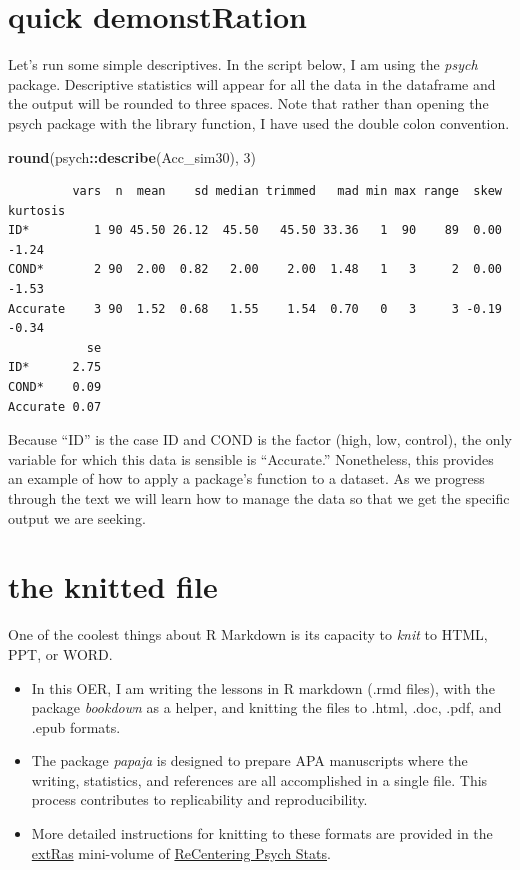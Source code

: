\documentclass[
  11pt,
]{book}
\newenvironment{Shaded}{\begin{snugshade}}{\end{snugshade}}
\newcommand{\DecValTok}[1]{\textcolor[rgb]{0.06,0.06,0.06}{#1}}
\newcommand{\FunctionTok}[1]{\textcolor[rgb]{0.27,0.27,0.27}{\textbf{#1}}}
\newcommand{\NormalTok}[1]{#1}
\newcommand{\SpecialCharTok}[1]{\textcolor[rgb]{0.43,0.43,0.43}{\textbf{#1}}}
\providecommand{\tightlist}{%
  \setlength{\itemsep}{0pt}\setlength{\parskip}{0pt}}
\begin{document}
\hypertarget{quick-demonstration}{%
\section{quick demonstRation}\label{quick-demonstration}}

Let's run some simple descriptives. In the script below, I am using the \emph{psych} package. Descriptive statistics will appear for all the data in the dataframe and the output will be rounded to three spaces. Note that rather than opening the psych package with the library function, I have used the double colon convention.

\begin{Shaded}
\begin{Highlighting}[]
\FunctionTok{round}\NormalTok{(psych}\SpecialCharTok{::}\FunctionTok{describe}\NormalTok{(Acc\_sim30), }\DecValTok{3}\NormalTok{)}
\end{Highlighting}
\end{Shaded}

\begin{verbatim}
         vars  n  mean    sd median trimmed   mad min max range  skew kurtosis
ID*         1 90 45.50 26.12  45.50   45.50 33.36   1  90    89  0.00    -1.24
COND*       2 90  2.00  0.82   2.00    2.00  1.48   1   3     2  0.00    -1.53
Accurate    3 90  1.52  0.68   1.55    1.54  0.70   0   3     3 -0.19    -0.34
           se
ID*      2.75
COND*    0.09
Accurate 0.07
\end{verbatim}

Because ``ID'' is the case ID and COND is the factor (high, low, control), the only variable for which this data is sensible is ``Accurate.'' Nonetheless, this provides an example of how to apply a package's function to a dataset. As we progress through the text we will learn how to manage the data so that we get the specific output we are seeking.

\hypertarget{the-knitted-file}{%
\section{the knitted file}\label{the-knitted-file}}

One of the coolest things about R Markdown is its capacity to \emph{knit} to HTML, PPT, or WORD.

\begin{itemize}
\tightlist
\item
  In this OER, I am writing the lessons in R markdown (.rmd files), with the package \emph{bookdown} as a helper, and knitting the files to .html, .doc, .pdf, and .epub formats.
\item
  The package \emph{papaja} is designed to prepare APA manuscripts where the writing, statistics, and references are all accomplished in a single file. This process contributes to replicability and reproducibility.
\item
  More detailed instructions for knitting to these formats are provided in the \href{https://lhbikos.github.io/extRas/}{extRas} mini-volume of \href{https://lhbikos.github.io/BikosRVT/ReCenter.html}{ReCentering Psych Stats}.
\end{itemize}
\end{document}
